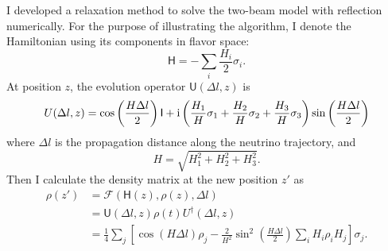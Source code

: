 I developed a relaxation method to solve the two-beam model with reflection numerically. For the purpose of illustrating the algorithm, I denote the Hamiltonian using its components in flavor space:
\begin{equation}
\mathsf H = -\sum_i \frac{H_i}{2}\sigma_i.
\end{equation}
At position $z$, the evolution operator $\mathsf U(\Delta l,z)$ is
\begin{align}
    U(\Delta l, z) = \cos \left( \frac{H \Delta l}{2} \right) \mathsf I + \mathrm{i} \left( \frac{H_1}{H}  \sigma_1 + \frac{H_2}{H} \sigma_2 + \frac{H_3}{H} \sigma_3 \right) \sin \left( \frac{H \Delta l}{2} \right) 
\end{align}
where $\Delta l$ is the propagation distance along the neutrino trajectory, and
\begin{equation}
    H = \sqrt{ H_1^2 + H_2^2 + H_3^2 }.
\end{equation} 
Then I calculate the density matrix at the new position $z'$ as
\begin{align}
    \rho ( z' ) &= \mathscr F ( \mathsf H(z), \rho(z), \Delta l ) \\
     &= \mathsf U (\Delta l, z) \rho(t)U^\dagger (\Delta l, z) \\
    & = \frac{1}{4} \sum_j \left[  \cos( H \Delta l) \rho_j - \frac{2}{H^2} \sin^2 \left( \frac{H \Delta l}{2} \right)  \sum_i H_i \rho_i H_j  \right] \sigma_j.
\end{align}
